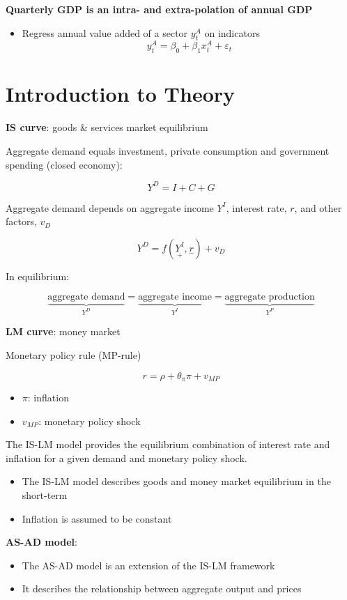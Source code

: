 \documentclass{article}
\begin{document}
\textbf{Quarterly GDP is an intra- and extra-polation of annual GDP}
\begin{itemize}
    \item Regress annual value added of a sector $y_t^A$ on indicators
    \[y_t^A=\beta_0+\beta_1 x_t^A+\varepsilon_t \]
\end{itemize}

\section{Introduction to Theory}

\textbf{IS curve}: goods \& services market equilibrium

Aggregate demand equals investment, private consumption and government spending (closed economy):

\[Y^D = I + C + G \]

Aggregate demand depends on aggregate income $Y^I$, interest rate, $r$, and other factors, $v_D$

\[Y^D = f(\underset{+}{Y^I}, \underset{-}{r}) + v_D \]

In equilibrium: 

\[\underbrace{\textrm{aggregate demand}}_{Y^D}=\underbrace{\textrm{aggregate income}}_{Y^I}=\underbrace{\textrm{aggregate production}}_{Y^P} \]

\textbf{LM curve}: money market

Monetary policy rule (MP-rule)

\[r=\rho+\theta_{\pi}\pi+v_{MP} \]

\begin{itemize}
    \item $\pi$: inflation
    \item $v_{MP}$: monetary policy shock
\end{itemize}

The IS-LM model provides the equilibrium combination of interest rate and inflation for a given demand and monetary policy shock.

\begin{itemize}
    \item The IS-LM model describes goods and money market equilibrium in the short-term
    \item Inflation is assumed to be constant
\end{itemize}

\textbf{AS-AD model}:

\begin{itemize}
    \item The AS-AD model is an extension of the IS-LM framework
    \item It describes the relationship between aggregate output and prices
\end{itemize}
\end{document}

